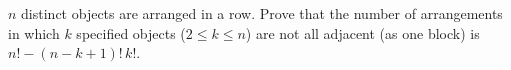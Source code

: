 $n$ distinct objects are arranged in a row. Prove that the number of arrangements in which $k$ specified objects ($2\le k\le n$) are not all adjacent (as one block) is $n!-(n-k+1)!\,k!$.
